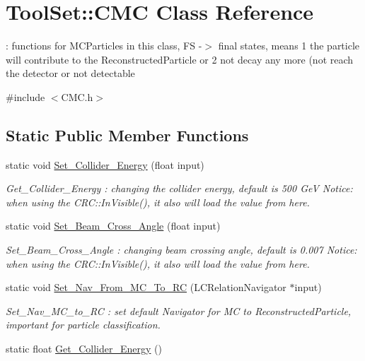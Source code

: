 \hypertarget{classToolSet_1_1CMC}{
\section{ToolSet::CMC Class Reference}
\label{classToolSet_1_1CMC}
}


: functions for MCParticles in this class, FS -\/$>$ final states, means 1 the particle will contribute to the ReconstructedParticle or 2 not decay any more (not reach the detector or not detectable  


{\ttfamily \#include $<$CMC.h$>$}\subsection*{Static Public Member Functions}
\begin{DoxyCompactItemize}
\item 
static void \hyperlink{classToolSet_1_1CMC_a2b939b1fd1e396eb5764c512903fe229}{Set\_\-Collider\_\-Energy} (float input)
\begin{DoxyCompactList}\small\item\em Get\_\-Collider\_\-Energy : changing the collider energy, default is 500 GeV Notice: when using the CRC::InVisible(), it also will load the value from here. \item\end{DoxyCompactList}\item 
static void \hyperlink{classToolSet_1_1CMC_a6d72918adb583b9dcaee3c0c9166f6cb}{Set\_\-Beam\_\-Cross\_\-Angle} (float input)
\begin{DoxyCompactList}\small\item\em Set\_\-Beam\_\-Cross\_\-Angle : changing beam crossing angle, default is 0.007 Notice: when using the CRC::InVisible(), it also will load the value from here. \item\end{DoxyCompactList}\item 
static void \hyperlink{classToolSet_1_1CMC_ab933f8f5cbebde554dcce60f086bf480}{Set\_\-Nav\_\-From\_\-MC\_\-To\_\-RC} (LCRelationNavigator $\ast$input)
\begin{DoxyCompactList}\small\item\em Set\_\-Nav\_\-MC\_\-to\_\-RC : set default Navigator for MC to ReconstructedParticle, important for particle classification. \item\end{DoxyCompactList}\item 
static float \hyperlink{classToolSet_1_1CMC_a7143149e3db8c1e5055498c8aba88182}{Get\_\-Collider\_\-Energy} ()

\end{DoxyCompactItemize}
